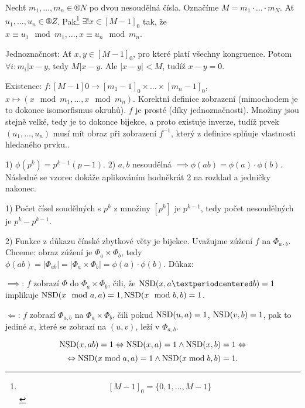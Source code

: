 \documentclass[12pt]{article}                   %
\begin{document}
        \begin{veta}
            Nechť $m_1, …, m_n \in ®N$ po dvou nesoudělná čísla. Označíme $M = m_1·…·m_N$. Ať $u_1, …, u_n \in ®Z$. Pak\footnote{$$ [M-1]_0 = \{0, 1, …, M-1\} $$ } $\exists! x \in [M-1]_0$ tak, že $x ≡ u_1 \mod m_1, …, x ≡ u_n \mod m_n$.

            \begin{dukazin}
                Jednoznačnost: Ať $x, y \in [M-1]_0$, pro které platí všechny kongruence. Potom $\forall i: m_i | x - y$, tedy $M | x - y$. Ale $|x - y| < M$, tudíž $x - y = 0$.

                Existence: $f: [M-1]0 \rightarrow [m_1-1]_0 \times … \times [m_n - 1]_0$, $x \mapsto (x \mod m_1, …, x \mod m_n)$. Korektní definice zobrazení (mimochodem je to dokonce isomorfismus okruhů). $f$ je prosté (díky jednoznačnosti). Množiny jsou stejně velké, tedy je to dokonce bijekce, a proto existuje inverze, tudíž prvek $(u_1, …, u_n)$ musí mít obraz při zobrazení $f^{-1}$, který z definice splňuje vlastnosti hledaného prvku..
            \end{dukazin}
        \end{veta}

        \begin{dukaz}
            1) $\phi(p^k) = p^{k-1}(p-1)$. 2) $a, b$ nesoudělná $\implies \phi(ab) = \phi(a)·\phi(b)$. Následně se vzorec dokáže aplikováním hodněkrát 2 na rozklad a jedničky nakonec.

            1) Počet čísel soudělných s $p^k$ z množiny $[p^k]$ je $p^{k-1}$, tedy počet nesoudělných je $p^k - p^{k-1}$.

            2) Funkce z důkazu čínské zbytkové věty je bijekce. Uvažujme zúžení $f$ na $\Phi_{a·b}$. Chceme: obraz zúžení je $\Phi_a \times \Phi_b$, tedy $\phi(ab) = |\Phi_{ab}| = |\Phi_a \times \Phi_b| = \phi(a)·\phi(b)$. Důkaz:

            $\implies$: $f$ zobrazí $\Phi$ do $\Phi_a \times \Phi_b$, čili, že $\NSD(x, a·b) = 1$ implikuje $\operatorname{NSD}(x \mod a, a) = 1, \operatorname{NSD}(x \mod b, b) = 1$.

            $\Leftarrow$: $f$ zobrazí $\Phi_{a, b}$ na $\Phi_a \times \Phi_b$, čili pokud $\operatorname{NSD}(u, a) = 1$, $\operatorname{NSD}(v, b) = 1$, pak to jediné $x$, které se zobrazí na $(u, v)$, leží v $\Phi_{a, b}$.

            $$ \operatorname{NSD}(x, ab) = 1 \Leftrightarrow \operatorname{NSD}(x, a) = 1 \land \operatorname{NSD}(x, b) = 1 \Leftrightarrow $$
            $$ \Leftrightarrow \operatorname{NSD}(x \bmod a, a) = 1 \land \operatorname{NSD}(x \bmod b, b) = 1. $$ 
        \end{dukaz}
\end{document}
